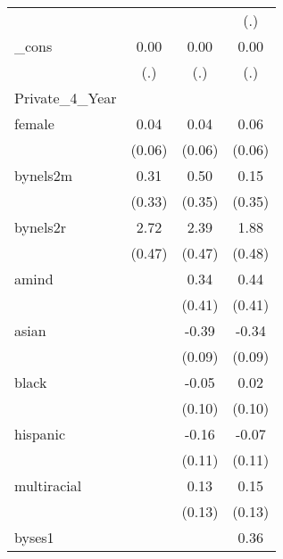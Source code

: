 {\begin{tabular}{l*{3}{c}}
            &                     &                     &         (.)         \\
[1em]
\_cons      &        0.00         &        0.00         &        0.00         \\
            &         (.)         &         (.)         &         (.)         \\
\hline
Private\_4\_Year&                     &                     &                     \\
female      &        0.04         &        0.04         &        0.06         \\
            &      (0.06)         &      (0.06)         &      (0.06)         \\
[1em]
bynels2m    &        0.31         &        0.50         &        0.15         \\
            &      (0.33)         &      (0.35)         &      (0.35)         \\
[1em]
bynels2r    &        2.72\sym{***}&        2.39\sym{***}&        1.88\sym{***}\\
            &      (0.47)         &      (0.47)         &      (0.48)         \\
[1em]
amind       &                     &        0.34         &        0.44         \\
            &                     &      (0.41)         &      (0.41)         \\
[1em]
asian       &                     &       -0.39\sym{***}&       -0.34\sym{***}\\
            &                     &      (0.09)         &      (0.09)         \\
[1em]
black       &                     &       -0.05         &        0.02         \\
            &                     &      (0.10)         &      (0.10)         \\
[1em]
hispanic    &                     &       -0.16         &       -0.07         \\
            &                     &      (0.11)         &      (0.11)         \\
[1em]
multiracial &                     &        0.13         &        0.15         \\
            &                     &      (0.13)         &      (0.13)         \\
[1em]
byses1      &                     &                     &        0.36\sym{***}\\

\end{tabular}}
